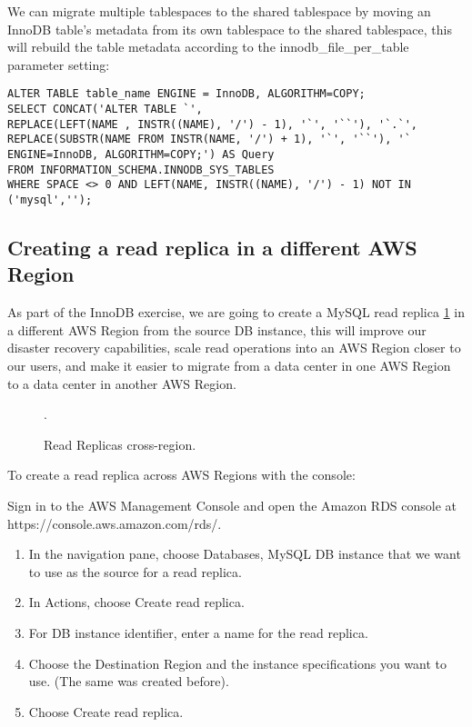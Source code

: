\documentclass{article}
\begin{document}
We can migrate multiple tablespaces to the shared tablespace by moving an InnoDB table's metadata from its own tablespace to the shared tablespace, this will rebuild the table metadata according to the innodb\_file\_per\_table parameter setting:

\begin{lstlisting}[caption=Skipping read replica error.]
ALTER TABLE table_name ENGINE = InnoDB, ALGORITHM=COPY; 
SELECT CONCAT('ALTER TABLE `', 
REPLACE(LEFT(NAME , INSTR((NAME), '/') - 1), '`', '``'), '`.`', 
REPLACE(SUBSTR(NAME FROM INSTR(NAME, '/') + 1), '`', '``'), '` ENGINE=InnoDB, ALGORITHM=COPY;') AS Query 
FROM INFORMATION_SCHEMA.INNODB_SYS_TABLES 
WHERE SPACE <> 0 AND LEFT(NAME, INSTR((NAME), '/') - 1) NOT IN ('mysql','');
\end{lstlisting}

\subsection{Creating a read replica in a different AWS Region}
As part of the InnoDB exercise, we are going to create a MySQL read replica \ref{fig:readreplica} in a different AWS Region from the source DB instance, this will improve our disaster recovery capabilities, scale read operations into an AWS Region closer to our users, and make it easier to migrate from a data center in one AWS Region to a data center in another AWS Region.

\begin{figure}[hbt!]
\centering
\caption{\label{fig:readreplica} Read Replicas cross-region.}
.
\end{figure}

To create a read replica across AWS Regions with the console:

Sign in to the AWS Management Console and open the Amazon RDS console at https://console.aws.amazon.com/rds/.

\begin{enumerate}
    \item In the navigation pane, choose Databases, MySQL DB instance that we want to use as the source for a read replica.
    \item In Actions, choose Create read replica.
    \item For DB instance identifier, enter a name for the read replica.
    \item Choose the Destination Region and the instance specifications you want to use. (The same was created before).
    \item Choose Create read replica.
\end{enumerate}
\end{document}
